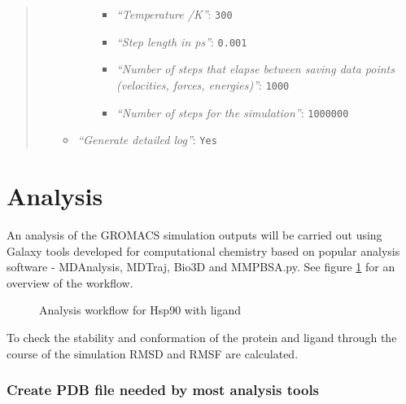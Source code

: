 \documentclass[twocolumn]{bmcart}%
\providecommand{\tightlist}{%
  \setlength{\itemsep}{0pt}\setlength{\parskip}{0pt}}
\providecommand{\tightlist}{%
  \setlength{\itemsep}{0pt}\setlength{\parskip}{0pt}}
\begin{document}
\begin{quote}
\begin{enumerate}
\begin{itemize}
\begin{itemize}
      \begin{itemize}
      \tightlist
      \item
        \emph{``Temperature /K''}: \texttt{300}
      \item
        \emph{``Step length in ps''}: \texttt{0.001}
      \item
        \emph{``Number of steps that elapse between saving data points
        (velocities, forces, energies)''}: \texttt{1000}
      \item
        \emph{``Number of steps for the simulation''}: \texttt{1000000}
      \end{itemize}
    \end{itemize}
  \item
    \emph{``Generate detailed log''}: \texttt{Yes}
  \end{itemize}
\end{enumerate}

\end{quote}

\hypertarget{analysis}{%
\section*{Analysis}\label{analysis}}

An analysis of the GROMACS simulation outputs will be carried out using Galaxy tools developed for computational chemistry\cite{senapathi_biomolecular_2019} based on popular analysis software - MDAnalysis\cite{michaudagrawal_mdanalysis_2011}, MDTraj\cite{mcgibbon_mdtraj_2015}, Bio3D\cite{skjaerven_integrating_2014} and MMPBSA.py\cite{miller_mmpbsa}. See figure \ref{fig:analysisworkflow} for an overview of the workflow.

\begin{figure}[h!]
\caption{
    Analysis workflow for Hsp90 with ligand}
\centering
\label{fig:analysisworkflow}
\end{figure}

To check the stability and conformation of the protein and ligand through the course of the simulation RMSD and RMSF are calculated.




\hypertarget{create-pdb-file-needed-by-most-analysis-tools}{%
\subsubsection*{Create PDB file needed by most analysis
tools}\label{create-pdb-file-needed-by-most-analysis-tools}}
\end{document}
